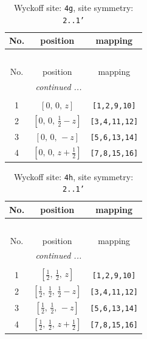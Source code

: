 \documentclass[fleqn,8pt]{jsarticle}
\begin{document}
\renewcommand{\arraystretch}{1.2}
\begin{longtable}{ccc}
\caption{Wyckoff site: {\tt 4g}, site symmetry: {\tt 2..1'}}
 \\
 \hline \hline
No. & position & mapping \\ \hline \endfirsthead

\multicolumn{2}{l}{\tablename\ \thetable{}} \\
 \hline \hline
No. & position & mapping \\ \hline \endhead

 \hline \hline
\multicolumn{2}{r}{\footnotesize\it continued ...} \\ \endfoot

 \hline \hline
\multicolumn{2}{r}{} \\ \endlastfoot

1 & $\left[ 0,\, 0,\, z \right]$ & {\tt [1,2,9,10]} \\ \hline
2 & $\left[ 0,\, 0,\, \frac{1}{2} - z \right]$ & {\tt [3,4,11,12]} \\ \hline
3 & $\left[ 0,\, 0,\, - z \right]$ & {\tt [5,6,13,14]} \\ \hline
4 & $\left[ 0,\, 0,\, z + \frac{1}{2} \right]$ & {\tt [7,8,15,16]} \\
\end{longtable}
\renewcommand{\arraystretch}{1.2}
\begin{longtable}{ccc}
\caption{Wyckoff site: {\tt 4h}, site symmetry: {\tt 2..1'}}
 \\
 \hline \hline
No. & position & mapping \\ \hline \endfirsthead

\multicolumn{2}{l}{\tablename\ \thetable{}} \\
 \hline \hline
No. & position & mapping \\ \hline \endhead

 \hline \hline
\multicolumn{2}{r}{\footnotesize\it continued ...} \\ \endfoot

 \hline \hline
\multicolumn{2}{r}{} \\ \endlastfoot

1 & $\left[ \frac{1}{2},\, \frac{1}{2},\, z \right]$ & {\tt [1,2,9,10]} \\ \hline
2 & $\left[ \frac{1}{2},\, \frac{1}{2},\, \frac{1}{2} - z \right]$ & {\tt [3,4,11,12]} \\ \hline
3 & $\left[ \frac{1}{2},\, \frac{1}{2},\, - z \right]$ & {\tt [5,6,13,14]} \\ \hline
4 & $\left[ \frac{1}{2},\, \frac{1}{2},\, z + \frac{1}{2} \right]$ & {\tt [7,8,15,16]} \\
\end{longtable}
\end{document}
